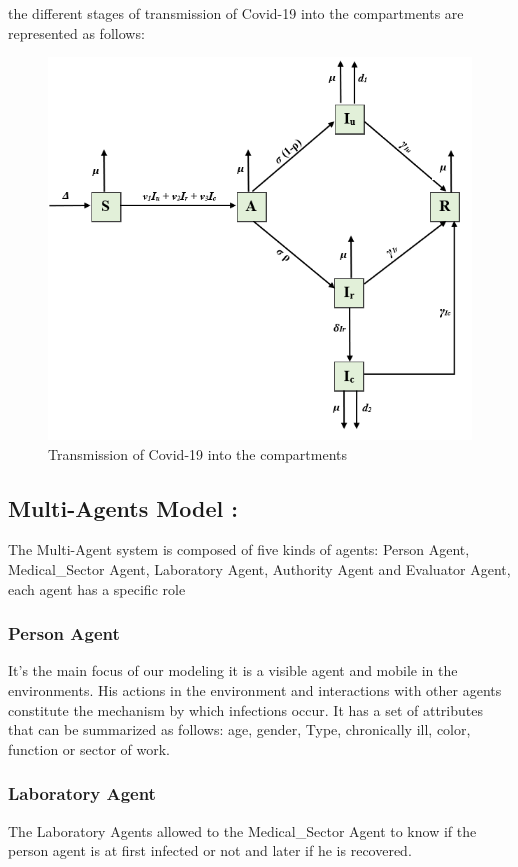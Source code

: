 \documentclass[paper=a4, fontsize=11.5pt]{scrartcl}
\numberwithin{equation}{section}		%
\numberwithin{figure}{section}			%
\numberwithin{table}{section}				%
\begin{document}
\\
\\
the different stages of transmission of Covid-19 into the compartments are represented as follows:
\begin{figure}[h]
	\centering
	\includegraphics [width=0.95\linewidth]{ Figs/SEIR.png}
	\caption{Transmission of Covid-19 into the compartments}
	\label{Figure1}
\end{figure}

\subsection{Multi-Agents Model : }
\quad The Multi-Agent system is composed of five kinds of agents: Person Agent, Medical\_Sector Agent, Laboratory Agent, Authority Agent and Evaluator Agent, each agent has a specific role

\subsubsection{Person Agent}
\quad It's the main focus of our modeling it is a visible agent and mobile in the environments. His actions in the environment and interactions with other agents constitute the mechanism by which infections occur. It has a set of attributes that can be summarized as follows: age, gender, Type, chronically ill, color, function or sector of work.

\subsubsection{Laboratory Agent}
\quad The Laboratory Agents allowed to the Medical\_Sector Agent to know if the person agent is at first infected or not and later if he is recovered.
\end{document}
